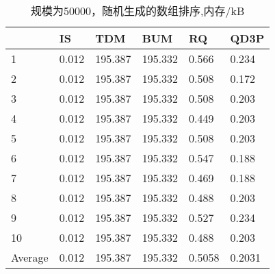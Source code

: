 \documentclass[12pt,a4paper]{ctexart}
\begin{document}
\begin{table}[H]
    \setlength{\abovecaptionskip}{0cm}
    \setlength{\belowcaptionskip}{0.5cm}
    \small
    \centering
    \caption[short]{规模为50000，随机生成的数组排序,内存/kB}
    \begin{tabular}{|l|l|l|l|l|l|}
        \hline
                & IS    & TDM     & BUM     & RQ     & QD3P   \\ \hline
        1       & 0.012 & 195.387 & 195.332 & 0.566  & 0.234  \\ \hline
        2       & 0.012 & 195.387 & 195.332 & 0.508  & 0.172  \\ \hline
        3       & 0.012 & 195.387 & 195.332 & 0.508  & 0.203  \\ \hline
        4       & 0.012 & 195.387 & 195.332 & 0.449  & 0.203  \\ \hline
        5       & 0.012 & 195.387 & 195.332 & 0.508  & 0.203  \\ \hline
        6       & 0.012 & 195.387 & 195.332 & 0.547  & 0.188  \\ \hline
        7       & 0.012 & 195.387 & 195.332 & 0.469  & 0.188  \\ \hline
        8       & 0.012 & 195.387 & 195.332 & 0.488  & 0.203  \\ \hline
        9       & 0.012 & 195.387 & 195.332 & 0.527  & 0.234  \\ \hline
        10      & 0.012 & 195.387 & 195.332 & 0.488  & 0.203  \\ \hline
        Average & 0.012 & 195.387 & 195.332 & 0.5058 & 0.2031 \\ \hline
    \end{tabular}
\end{table}
\end{document}
